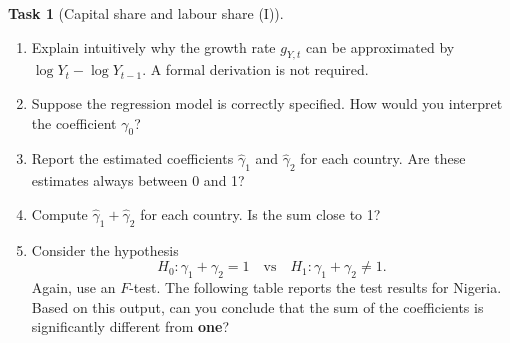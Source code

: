 \documentclass{book}
\theoremstyle{definition}
\newtheorem{task}{Task}[chapter]
\theoremstyle{plain}
\begin{document}
\begin{task}[Capital share and labour share (I)]
\begin{enumerate}[label=\arabic*.]
\begin{enumerate}[label=\roman*.]
        \item Explain intuitively why the growth rate $g_{Y,t}$ can be approximated by $\log Y_{t} - \log Y_{t-1}$. A formal derivation is not required.
        
        \item Suppose the regression model is correctly specified. How would you interpret the coefficient $\gamma_0$?
        
        \item Report the estimated coefficients $\hat{\gamma}_1$ and $\hat{\gamma}_2$ for each country. Are these estimates always between 0 and 1?
        
        \item Compute $\hat{\gamma}_1 + \hat{\gamma}_2$ for each country. Is the sum close to 1?
        
        \item Consider the hypothesis
        \[
        H_0: \gamma_1 + \gamma_2 = 1 
        \quad \text{vs} \quad 
        H_1: \gamma_1 + \gamma_2 \neq 1.
        \]
        Again, use an $F$-test. The following table reports the test results for Nigeria. Based on this output, can you conclude that the sum of the coefficients is significantly different from \textbf{one}?
        
        
        \end{enumerate}
        
    \end{enumerate}
\end{task}
\end{document}
